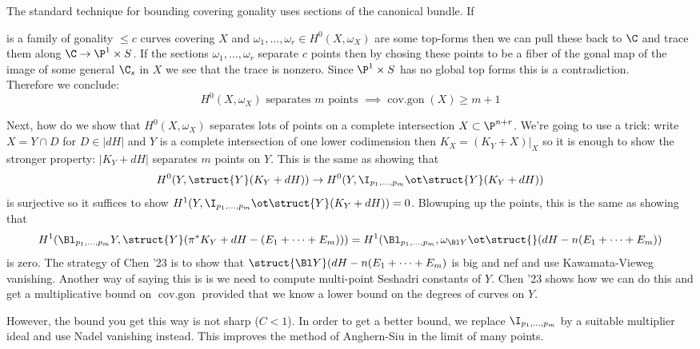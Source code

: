 \documentclass[12pt]{article}
\theoremstyle{plain}
\DeclareMathOperator{\cg}{cov.gon}
\begin{document}
The standard technique for bounding covering gonality uses sections of the canonical bundle. If 
\begin{center}
\end{center}

 is a family of gonality $\le c$ curves covering $X$ and $\omega_1, \dots, \omega_r \in H^0(X, \omega_X)$ are some top-forms then we can pull these back to $\C$ and trace them along $\C \to \P^1 \times S$. {\color{red} If the sections $\omega_1, \dots, \omega_r$ separate $c$ points then by chosing these points to be a fiber of the gonal map of the image of some general $\C_s$ in $X$ we see that the trace is nonzero. Since $\P^1 \times S$ has no global top forms this is a contradiction.}
\bigskip\\
Therefore we conclude:
\[ H^0(X, \omega_X) \text{ separates } m \text{ points } \implies \cg(X) \ge m + 1 \]

Next, how do we show that $H^0(X, \omega_X)$ separates lots of points on a complete intersection $X \subset \P^{n+r}$. We're going to use a trick: write $X = Y \cap D$ for $D \in |d H|$ and $Y$ is a complete intersection of one lower codimension then $K_X = (K_Y + X)|_X$ so it is enough to show the stronger property: $|K_Y + d H|$ separates $m$ points on $Y$. This is the same as showing that
\[ H^0(Y, \struct{Y}(K_Y + d H)) \to H^0(Y, \I_{p_1, \dots, p_m} \ot \struct{Y}(K_Y + d H)) \]
is surjective so it suffices to show $H^1(Y, \I_{p_1, \dots, p_m} \ot \struct{Y}(K_Y + dH)) = 0$. Blowuping up the points, this is the same as showing that
\[ H^1(\Bl_{p_1, \dots, p_m} Y, \struct{Y}(\pi^* K_Y + d H - (E_1 + \cdots + E_m))) = H^1(\Bl_{p_1, \dots, p_m}, \omega_{\Bl Y} \ot \struct{}(d H - n (E_1 + \cdots + E_m)) \]
is zero. The strategy of Chen '23 is to show that $\struct{\Bl Y}(d H - n (E_1 + \cdots + E_m)$ is big and nef and use Kawamata-Vieweg vanishing. Another way of saying this is is we need to compute multi-point Seshadri constants of $Y$. Chen '23 shows how we can do this and get a multiplicative bound on $\cg$ provided that we know a lower bound on the degrees of curves on $Y$. 

{\color{red} However, the bound you get this way is not sharp ($C < 1$). In order to get a better bound, we replace $\I_{p_1, \dots, p_m}$ by a suitable multiplier ideal and use Nadel vanishing instead. This improves the method of Anghern-Siu in the limit of many points}.  
\end{document}
